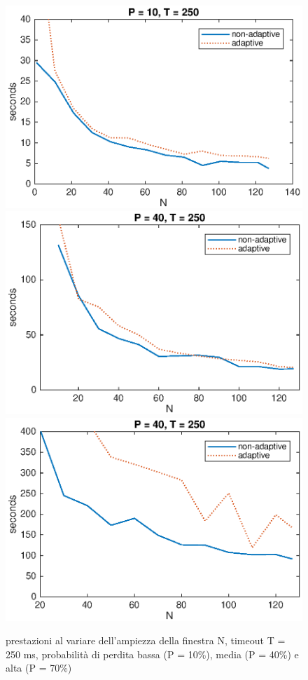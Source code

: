 \begin{figure}[!hp]
	\includegraphics[scale=0.5]{images/N_T250_P10}
	\includegraphics[scale=0.5]{images/N_T250_P40}
	\includegraphics[scale=0.5]{images/N_T250_P70}
	\caption{prestazioni al variare dell'ampiezza della finestra N,
			 timeout T = 250 ms, probabilità di perdita bassa (P = 10\%),
			 media (P = 40\%) e alta (P = 70\%)}
\end{figure}
